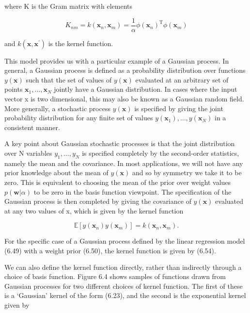 \documentclass[
  10
]{article}
\begin{document}
where K is the Gram matrix with elements

\[
K _ {n m} = k (\mathbf {x} _ {n}, \mathbf {x} _ {m}) = \frac {1}{\alpha} \phi (\mathbf {x} _ {n}) ^ {\mathrm{T}} \phi (\mathbf {x} _ {m})\tag{6.54}
\]

and \(k ( \mathbf { x } , \mathbf { x } ^ { \prime } )\) is the kernel
function.

This model provides us with a particular example of a Gaussian process.
In general, a Gaussian process is defined as a probability distribution
over functions \(y ( \mathbf x )\) such that the set of values of
\(y ( \mathbf x )\) evaluated at an arbitrary set of points
\(\mathbf { x } _ { 1 } , \ldots , \mathbf { x } _ { N }\) jointly have
a Gaussian distribution. In cases where the input vector x is two
dimensional, this may also be known as a Gaussian random field. More
generally, a stochastic process \(y ( \mathbf x )\) is specified by
giving the joint probability distribution for any finite set of values
\(y ( \mathbf { x } _ { 1 } ) , \ldots , y ( \mathbf { x } _ { N } )\)
in a consistent manner.

A key point about Gaussian stochastic processes is that the joint
distribution over N variables \(y _ { 1 } , \ldots , y _ { N }\) is
specified completely by the second-order statistics, namely the mean and
the covariance. In most applications, we will not have any prior
knowledge about the mean of \(y ( \mathbf x )\) and so by symmetry we
take it to be zero. This is equivalent to choosing the mean of the prior
over weight values \(p ( \mathbf { w } | \alpha )\) to be zero in the
basis function viewpoint. The specification of the Gaussian process is
then completed by giving the covariance of \(y ( \mathbf x )\) evaluated
at any two values of x, which is given by the kernel function

\[
\mathbb {E} \left[ y (\mathbf {x} _ {n}) y (\mathbf {x} _ {m}) \right] = k (\mathbf {x} _ {n}, \mathbf {x} _ {m}).\tag{6.55}
\]

For the specific case of a Gaussian process defined by the linear
regression model (6.49) with a weight prior (6.50), the kernel function
is given by (6.54).

We can also define the kernel function directly, rather than indirectly
through a choice of basis function. Figure 6.4 shows samples of
functions drawn from Gaussian processes for two different choices of
kernel function. The first of these is a `Gaussian' kernel of the form
(6.23), and the second is the exponential kernel given by
\end{document}
